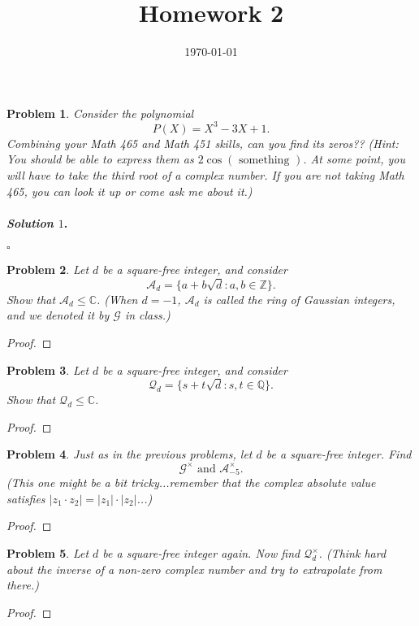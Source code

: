 \documentclass[reqno]{amsart}
\theoremstyle{plain}
\newtheorem{problem}{Problem}
\theoremstyle{definition}
\newenvironment{solution1}{\paragraph{\emph{Solution $1$}.}}{\hfill$\square$}
\begin{document}
 

\title[Homework 2]{Homework 2}

\date{\today} 
\maketitle 


\begin{problem}
Consider the polynomial
$$P(X) = X^{3} - 3X + 1. $$
Combining your Math 465 and Math 451 skills, can you find its zeros??  (Hint:  You should be able to express them as $2 \cos(\text{ something })$.  At some point, you will have to take the third root of a complex number.  If you are not taking Math 465, you can look it up or come ask me about it.)
\end{problem}
\begin{solution1}

\end{solution1}

\begin{problem}
Let $d$ be a square-free integer, and consider 
$$\mathcal{A}_{d} = \{a+b\sqrt{d}: a,b \in \mathbb{Z} \}. $$
Show that $\mathcal{A}_{d} \le \mathbb{C}$.  (When $d=-1$, $\mathcal{A}_{d}$ is called the ring of Gaussian integers, and we denoted it by $\mathcal{G}$ in class.)
\end{problem}
\begin{proof}

\end{proof}

\begin{problem}
Let $d$ be a square-free integer, and consider
$$\mathcal{Q}_{d} =\{s + t \sqrt{d} : s,t \in \mathbb{Q} \}. $$
Show that $\mathcal{Q}_{d} \le \mathbb{C}$.
\end{problem}
\begin{proof}

\end{proof}

\begin{problem}
Just as in the previous problems, let $d$ be a square-free integer.  Find
$$\mathcal{G}^{\times} \text{ and } \mathcal{A}_{-5}^{\times}. $$
(This one might be a bit tricky...remember that the complex absolute value satisfies $|z_{1} \cdot z_{2}| = |z_{1}|\cdot |z_{2}|$...)
\end{problem}
\begin{proof}

\end{proof}

\begin{problem}
Let $d$ be a square-free integer again.  Now find $\mathcal{Q}_{d}^{\times}$.  (Think hard about the inverse of a non-zero complex number and try to extrapolate from there.)
\end{problem}
\begin{proof}

\end{proof}
\end{document}
